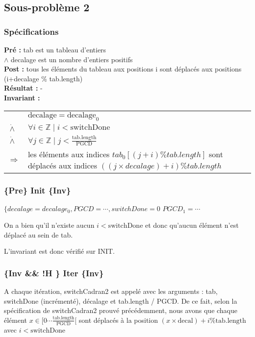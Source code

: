 \subsection{Sous-problème 2}
\subsubsection*{Spécifications}

\noindent \textbf{Pré :} tab est un tableau d'entiers\\
\indent \indent $\wedge$ decalage est un nombre d'entiers positifs\\
\textbf{Post :} tous les éléments du tableau aux positions i sont déplacés aux positions (i+decalage \% tab.length)\\
\textbf{Résultat :} - \\



\textbf{Invariant :}

\begin{tabular}{ll}

& $\mathrm{decalage}=\mathrm{decalage}_{0}$ \\
$\dot{\wedge}$ & $\forall i \in \mathbb{Z} \mid i < \mathrm{switchDone} $ \\
$\dot{\wedge}$ & $\forall j \in \mathbb{Z} \mid j < \frac{\mathrm{tab.length}}{\mathrm{PGCD}}$ \\
$\Rightarrow$ & les éléments aux indices $tab_{0}[(j+i) \% tab.length]$ sont déplacés aux indices $((j\times decalage)+i) \% tab.length$ \\
\end{tabular}

\subsubsection*{\{Pre\} Init \{Inv\}}

$\{decalage=decalage_{0}, PGCD =\cdots, switchDone=0$
$PGCD_{1} = \cdots$

On a bien qu'il n'existe aucun $i < \mathrm{switchDone}$ et donc
qu'aucun élément n'est déplacé au sein de tab.

L'invariant est donc vérifié sur INIT.

\subsubsection*{\{Inv \&\& !H \} Iter \{Inv\}}

A chaque itération, switchCadran2 est appelé avec les arguments : tab,
switchDone (incrémenté), décalage et tab.length / PGCD. De ce fait,
selon la spécification de switchCadran2 prouvé précédemment, nous avons
que chaque élément $x \in [0\cdots
    \frac{\mathrm{tab.length}}{\mathrm{PGCD}}[$ sont déplacés à la
        position $(x\times \mathrm{decal})+i \% \mathrm{tab.length}$ avec $i < \mathrm{switchDone}$

